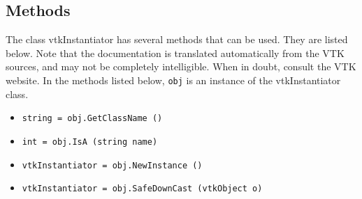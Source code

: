 \subsection{Methods}

The class vtkInstantiator has several methods that can be used.
  They are listed below.
Note that the documentation is translated automatically from the VTK sources,
and may not be completely intelligible.  When in doubt, consult the VTK website.
In the methods listed below, \verb|obj| is an instance of the vtkInstantiator class.
\begin{itemize}
\item  \verb|string = obj.GetClassName ()|

\item  \verb|int = obj.IsA (string name)|

\item  \verb|vtkInstantiator = obj.NewInstance ()|

\item  \verb|vtkInstantiator = obj.SafeDownCast (vtkObject o)|

\end{itemize}
